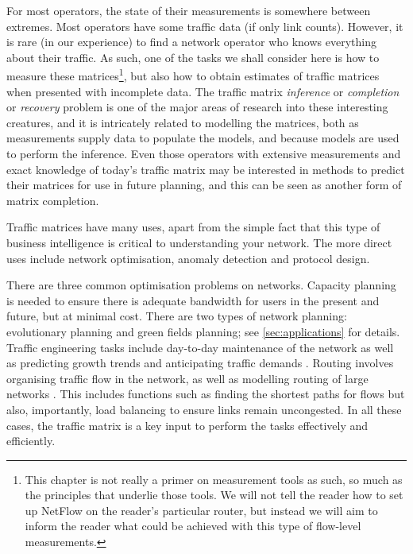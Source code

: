 For most operators, the state of their measurements is somewhere
between extremes. Most operators have some traffic data (if only link
counts). However, it is rare (in our experience) to find a network
operator who knows everything about their traffic. As such, one of the
tasks we shall consider here is how to measure these
matrices\footnote{This chapter is not really a primer on measurement
  tools as such, so much as the principles that underlie those
  tools. We will not tell the reader how to set up NetFlow on the reader's particular
  router, but instead we will aim to inform the reader what could be achieved
  with this type of flow-level measurements.}, but also how to obtain
estimates of traffic matrices when presented with incomplete data. The
traffic matrix {\em inference} or {\em completion} or {\em recovery}
problem is one of the major areas of research into these interesting
creatures, and it is intricately related to modelling the matrices,
both as measurements supply data to populate the models, and because
models are used to perform the inference.  Even those operators with
extensive measurements and exact knowledge of today's traffic matrix
may be interested in methods to predict their matrices for use in
future planning, and this can be seen as another form of matrix
completion.

Traffic matrices have many uses, apart from the simple fact that this
type of business intelligence is critical to understanding your
network. The more direct uses include network optimisation, anomaly
detection and protocol design.

There are three common optimisation problems on networks.  Capacity
planning is needed to ensure there is adequate bandwidth for users in
the present and future, but at minimal cost. There are two types of
network planning: evolutionary planning and green fields planning; see
\autoref{sec:applications} for details. Traffic engineering tasks
include day-to-day maintenance of the network as well as predicting
growth trends and anticipating traffic demands \cite{Mitra05StochasticTE,Buriol03GAOSPF,Murphy02TE,Fortz02OSPF,Fortz03OSPF,Nucci07IGP,Uhlig04Implications,Feamster03BGPTE,Rexford06Route}. Routing involves
organising traffic flow in the network, as well as modelling routing of 
large networks \cite{Quoitin05CBGP}. This includes functions such
as finding the shortest paths for flows but also, importantly, load
balancing to ensure links remain uncongested. In all these cases, the
traffic matrix is a key input to perform the tasks effectively and
efficiently.

